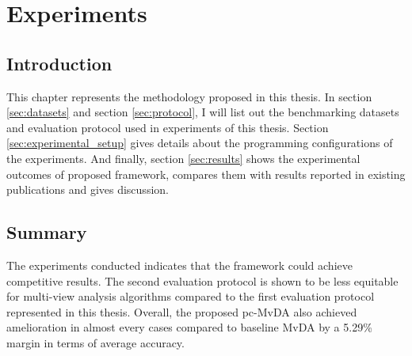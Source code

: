 
\chapter{Experiments} \label{chap:experimental_result}
    \section{Introduction}
        This chapter represents the methodology proposed in this thesis.
        In section \ref{sec:datasets} and section \ref{sec:protocol}, I will list out the benchmarking datasets and evaluation protocol used in experiments of this thesis.
        Section \ref{sec:experimental_setup} gives details about the programming configurations of the experiments.
        And finally, section \ref{sec:results} shows the experimental outcomes of proposed framework, compares them with results reported in existing publications and gives discussion.

    
    
    
    

    \section{Summary}
        The experiments conducted indicates that the framework could achieve competitive results.
        The second evaluation protocol is shown to be less equitable for multi-view analysis algorithms compared to the first evaluation protocol represented in this thesis.
        Overall, the proposed pc-MvDA also achieved amelioration in almost every cases compared to baseline MvDA by a 5.29\% margin in terms of average accuracy.
